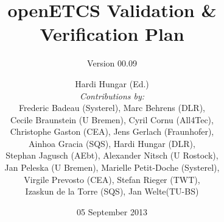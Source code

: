 \documentclass{template/openetcs_report}
\begin{document}
\frontmatter
{}




\title{openETCS Validation \& Verification Plan}

\subtitle{Version 00.09}

\date{05 September 2013}


\author{
Hardi Hungar (Ed.)\\
\small
{\it Contributions by:} \\
 Frederic Badeau (Systerel), Marc Behrens (DLR),\\
  Cecile Braunstein (U Bremen), Cyril Cornu (All4Tec),\\
 Christophe Gaston (CEA), Jens Gerlach (Fraunhofer),\\
 Ainhoa Gracia (SQS), Hardi Hungar (DLR),\\
Stephan Jagusch (AEbt), Alexander Nitsch (U Rostock),\\
 Jan Peleska (U Bremen), Marielle Petit-Doche (Systerel),\\
 Virgile Prevosto (CEA),  Stefan Rieger (TWT),\\ 
Izaskun de la Torre (SQS), Jan Welte(TU-BS)}


  

\end{document}
